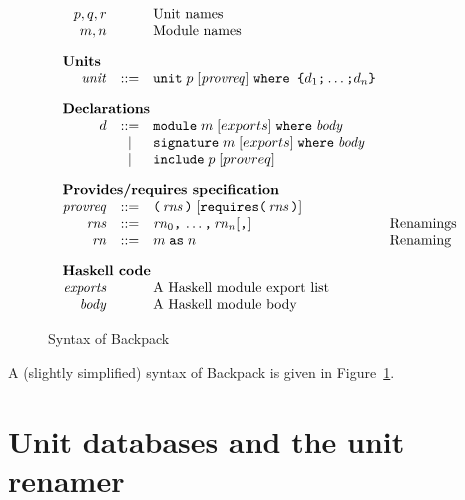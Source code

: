 \documentclass{article}
\newcommand{\I}[1]{\ensuremath{\mathit{#1}}}
\begin{document}
\begin{figure}[htpb]
$$
\begin{array}{rcll}
p,q,r && \mbox{Unit names} \\
m,n   && \mbox{Module names} \\[1em]
\multicolumn{3}{l}{\mbox{\bf Units}} \\
  \I{unit} & ::= & \verb|unit|\; p\; [\I{provreq}]\; \verb|where {| d_1 \verb|;| \ldots \verb|;| d_n \verb|}| \\[1em]
\multicolumn{3}{l}{\mbox{\bf Declarations}} \\
  d & ::= & \verb|module|\;    m \; [exports]\; \verb|where|\; \I{body} \\
    & |   & \verb|signature|\; m \; [exports]\; \verb|where|\; \I{body} \\
    & |   & \verb|include|\; p \; [provreq] \\[1em]
\multicolumn{3}{l}{\mbox{\bf Provides/requires specification}} \\
\I{provreq} & ::= & \verb|(| \, \I{rns} \, \verb|)| \; 
        [ \verb|requires(|\, \I{rns} \, \verb|)| ] \\
\I{rns} & ::= & \I{rn}_0 \verb|,| \, \ldots \verb|,| \, \I{rn}_n [\verb|,|] & \mbox{Renamings} \\
\I{rn} & ::= & m\; \verb|as| \; n & \mbox{Renaming} \\[1em] 
\multicolumn{3}{l}{\mbox{\bf Haskell code}} \\
\I{exports} & & \mbox{A Haskell module export list} \\
\I{body}    & & \mbox{A Haskell module body} \\
\end{array}
$$
\caption{Syntax of Backpack} \label{fig:syntax}
\end{figure}

A (slightly simplified) syntax of Backpack is given in Figure~\ref{fig:syntax}.

\newpage
\section{Unit databases and the unit renamer}
\end{document}
